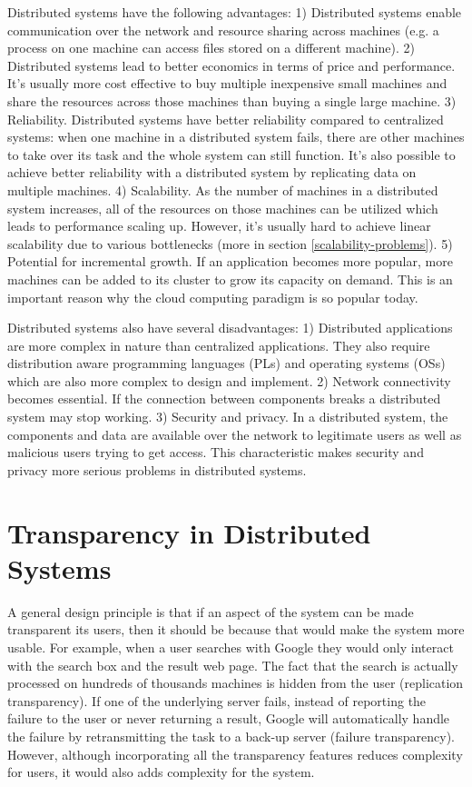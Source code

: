 \documentclass[twoside]{article}
\begin{document}
Distributed systems have the following advantages:
1) Distributed systems enable communication over the network and resource sharing across machines (e.g. a process on one machine can access files stored on a different machine).
2) Distributed systems lead to better economics in terms of price and performance. It's usually more cost effective to buy multiple inexpensive small machines and share the resources across those machines than buying a single large machine.
3) Reliability. Distributed systems have better reliability compared to centralized systems: when one machine in a distributed system fails, there are other machines to take over its task and the whole system can still function. It's also possible to achieve better reliability with a distributed system by replicating data on multiple machines.
4) Scalability. As the number of machines in a distributed system increases, all of the resources on those machines can be utilized which leads to performance scaling up. However, it's usually hard to achieve linear scalability due to various bottlenecks (more in section \ref{scalability-problems}).
5) Potential for incremental growth. If an application becomes more popular, more machines can be added to its cluster to grow its capacity on demand. This is an important reason why the cloud computing paradigm is so popular today.

Distributed systems also have several disadvantages:
1) Distributed applications are more complex in nature than centralized applications. They also require distribution aware programming languages (PLs) and operating systems (OSs) which are also more complex to design and implement.
2) Network connectivity becomes essential. If the connection between components breaks a distributed system may stop working.
3) Security and privacy. In a distributed system, the components and data are available over the network to legitimate users as well as malicious users trying to get access. This characteristic makes security and privacy more serious problems in distributed systems.

\section{Transparency in Distributed Systems}

A general design principle is that if an aspect of the system can be made transparent its users, then it should be because that would make the system more usable. For example, when a user searches with Google they would only interact with the search box and the result web page. The fact that the search is actually processed on hundreds of thousands machines is hidden from the user (replication transparency). If one of the underlying server fails, instead of reporting the failure to the user or never returning a result, Google will automatically handle the failure by retransmitting the task to a back-up server (failure transparency). However, although incorporating all the transparency features reduces complexity for users, it would also adds complexity for the system. 
\end{document}
